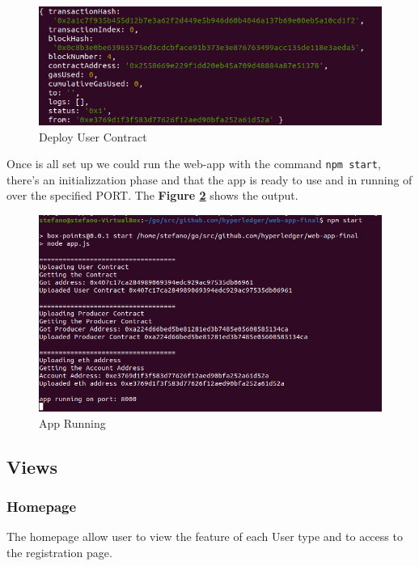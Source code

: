 \begin{figure}[h!]
    \centering
    \includegraphics[totalheight=4cm]{img/app-running/deployUserContract.png}
    \caption{Deploy User Contract}
    \label{fig:deploy-user-contract}
\end{figure}

Once is all set up we could run the web-app with the command \texttt{npm start}, there's an initializzation
phase and that the app is ready to use and in running of over the specified PORT. The \textbf{Figure \ref{fig:app-running}}
shows the output. 

\begin{figure}[h!]
    \centering
    \includegraphics[totalheight=6cm]{img/app-running/app-running.png}
    \caption{App Running}
    \label{fig:app-running}
\end{figure}

\newpage
\subsection{Views}

\subsubsection{Homepage}

The homepage allow user to view the feature of each User type and to access to the registration page.

